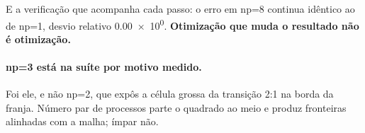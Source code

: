 E a verificação que acompanha cada passo: o erro em np=8 continua idêntico ao de
np=1, desvio relativo \num{0.00e0}. \textbf{Otimização que muda o resultado não
é otimização.}

\paragraph{np=3 está na suíte por motivo medido.} Foi ele, e não np=2, que expôs a
célula grossa da transição 2:1 na borda da franja. Número par de processos parte o
quadrado ao meio e produz fronteiras alinhadas com a malha; ímpar não.
